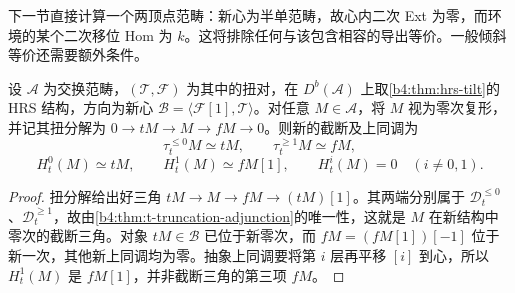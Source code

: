 \ProseParagraphBreak
下一节直接计算一个两顶点范畴：新心为半单范畴，故心内二次 Ext 为零，而环境的某个二次移位 Hom 为 \(k\)。这将排除任何与该包含相容的导出等价。一般倾斜等价还需要额外条件。

\begin{corollary}\label{b4:cor:hrs-old-heart-cohomology}
	设 \(\mathcal A\) 为交换范畴，\((\mathcal T,\mathcal F)\) 为其中的扭对，在 \(D^b(\mathcal A)\) 上取\cref{b4:thm:hrs-tilt}的 HRS 结构，方向为新心 \(\mathcal B=\langle\mathcal F[1],\mathcal T\rangle\)。对任意 \(M\in\mathcal A\)，将 \(M\) 视为零次复形，并记其扭分解为 \(0\to tM\to M\to fM\to0\)。则新的截断及上同调为
	\[
		\tau_t^{\le0}M\simeq tM,\qquad \tau_t^{\ge1}M\simeq fM,
	\]
	\[
		H_t^0(M)\simeq tM,\qquad H_t^1(M)\simeq fM[1],\qquad H_t^i(M)=0\quad(i\ne0,1).
	\]
\end{corollary}
\begin{proof}
	扭分解给出好三角 \(tM\to M\to fM\to(tM)[1]\)。其两端分别属于 \(\mathcal D_t^{\le0}\)、\(\mathcal D_t^{\ge1}\)，故由\cref{b4:thm:t-truncation-adjunction}的唯一性，这就是 \(M\) 在新结构中零次的截断三角。对象 \(tM\in\mathcal B\) 已位于新零次，而 \(fM=(fM[1])[-1]\) 位于新一次，其他新上同调均为零。抽象上同调要将第 \(i\) 层再平移 \([i]\) 到心，所以 \(H_t^1(M)\) 是 \(fM[1]\)，并非截断三角的第三项 \(fM\)。
\end{proof}
